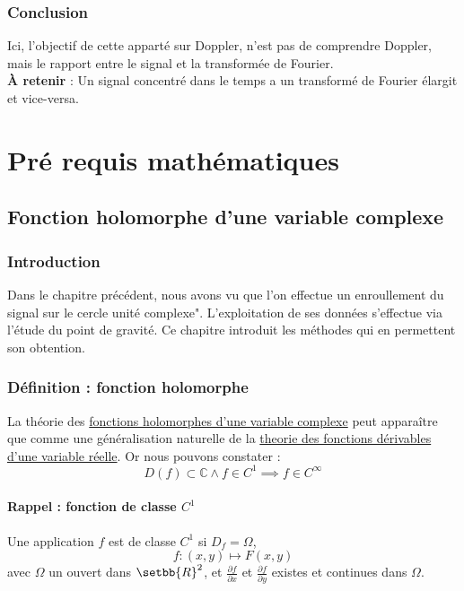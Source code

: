 \documentclass[a4paper]{book}
\begin{document}
\section{Conclusion}

Ici, l'objectif de cette apparté sur Doppler, n'est pas de comprendre Doppler,
mais le rapport entre le signal et la transformée de Fourier.\\
\textbf{À retenir} : Un signal concentré dans le temps a un transformé de 
Fourier élargit et vice-versa.





\part{Pré requis mathématiques}
\chapter{Fonction holomorphe d'une variable complexe}
\section{Introduction}
Dans le chapitre précédent, nous avons vu que l'on effectue un
enroullement du signal sur le cercle unité complexe". L'exploitation de ses
données s'effectue via l'étude du point de gravité. Ce chapitre introduit les
méthodes qui en permettent son obtention.

\section{Définition : fonction holomorphe}
La théorie des \underline{fonctions holomorphes d'une variable complexe} peut
apparaître que comme une généralisation naturelle de la \underline{theorie des
fonctions dérivables d'une variable réelle}. Or nous pouvons constater :
\[
	D(f) \subset \mathbb{C} \wedge f \in C^{1} \implies f \in C^{\infty}
\]

\subsection{Rappel : fonction de classe $C^1$}
Une application $f$ est de classe $C^1$ si $D_{f} = \Omega$,
\[
	f:(x,y) \mapsto F(x,y) 
\]
avec $\Omega$ un ouvert dans $\setbb{R}^{2}$, et $\frac{\partial f}{\partial x}$ et
$\frac{\partial f}{\partial y}$ existes et continues dans $\Omega$.
\end{document}
